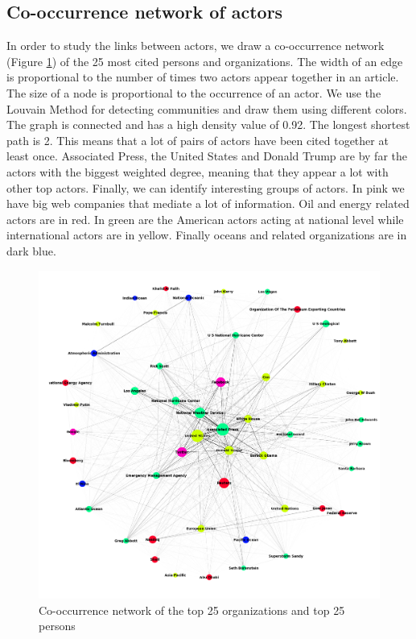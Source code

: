 \documentclass[11pt]{article}
\begin{document}
\subsection{Co-occurrence network of actors}
In order to study the links between actors, we draw a co-occurrence network (Figure \ref{network}) of the 25 most cited persons and organizations. The width of an edge is proportional to the number of times two actors appear together in an article. The size of a node is proportional to the occurrence of an actor. We use the Louvain Method for detecting communities and draw them using different colors. The graph is connected and has a high density value of 0.92. The longest shortest path is 2. This means that a lot of pairs of actors have been cited together at least once. Associated Press, the United States and Donald Trump are by far the actors with the biggest weighted degree, meaning that they appear a lot with other top actors. Finally, we can identify interesting groups of actors. In pink we have big web companies that mediate a lot of information. Oil and energy related actors are in red. In green are the American actors acting at national level while international actors are in yellow. Finally oceans and related organizations are in dark blue.

\begin{figure}
   \includegraphics[scale=0.15]{top_25.png}
    \caption{\label{network} Co-occurrence network of the top 25 organizations and top 25 persons}
\end{figure}
\end{document}
